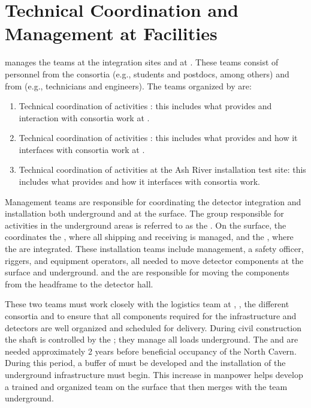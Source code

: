 \chapter{Technical Coordination and Management at Facilities}
\label{vl:tc-facility_mgmt}

  manages the teams at the integration sites and
at \surf. These teams consist of personnel from the consortia (e.g.,
students and postdocs, among others) and from  (e.g.,
technicians and engineers). The teams organized by  are:
\begin{enumerate}
 \item Technical coordination of activities \surf: this
   includes what  provides and interaction with consortia work
   at \surf.
 \item Technical coordination of activities : this includes
   what  provides and how it interfaces with consortia work at .
 \item Technical coordination of activities at the Ash River installation
   test site: this includes what  provides and how it
   interfaces with consortia work. 
\end{enumerate}



Management teams are responsible for coordinating the detector
integration and installation both underground and at the surface. The
group responsible for activities in the underground areas is referred
to as the .  On the surface, the  coordinates
the , where all  shipping and receiving is
managed, and the , where the  are integrated.
These installation teams include management, a safety officer,
riggers, and equipment operators, all needed to move detector
components at the surface and underground. \surf and the 
are responsible for moving the components from the headframe to the
detector hall.

These two teams must work closely with the  logistics team at
\surf, , the different consortia and  to
ensure that all components required for the infrastructure and
detectors are well organized and scheduled for delivery. During
civil construction the shaft is controlled by the ; they manage all loads
underground.  The  and  are
needed approximately 2 years before beneficial occupancy of the North
Cavern.  During this period, a buffer of  must be developed 
and  the installation of the underground infrastructure must begin. This
increase in manpower helps develop a trained and organized team on the
surface that then merges with the team underground.


